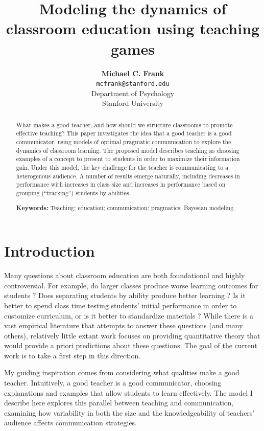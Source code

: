 \documentclass[10pt,letterpaper]{article}
\title{Modeling the dynamics of classroom education using teaching games}
\author{{\large \bf Michael C. Frank} \\
  \texttt{mcfrank@stanford.edu} \\
  Department of Psychology\\
  Stanford University}
\begin{document}
\maketitle

\begin{abstract}
What makes a good teacher, and how should we structure classrooms to promote effective teaching? This paper investigates the idea that a good teacher is a good communicator, using models of optimal pragmatic communication to explore the dynamics of classroom learning. The proposed model describes teaching as choosing examples of a concept to present to students in order to maximize their information gain. Under this model, the key challenge for the teacher is communicating to a heterogenous audience. A number of results emerge naturally, including decreases in performance with increases in class size and increases in performance based on grouping (``tracking'') students by abilities.

\textbf{Keywords:} 
Teaching; education; communication; pragmatics; Bayesian modeling.
\end{abstract}

\section{Introduction}

Many questions about classroom education are both foundational and highly controversial. For example, do larger classes produce worse learning outcomes for students \cite{glass1979,slavin1989}? Does separating students by ability produce better learning \cite{slavin1987}? Is it better to spend class time testing students' initial performance in order to customize curriculum, or is it better to standardize materials \cite{fuchs1986}? While there is a vast empirical literature that attempts to answer these questions (and many others), relatively little extant work focuses on providing quantitative theory that would provide a priori predictions about these questions. The goal of the current work is to take a first step in this direction.

My guiding inspiration comes from considering what qualities make a good teacher. Intuitively, a good teacher is a good communicator, choosing explanations and examples that allow students to learn effectively. The model I describe here explores this parallel between teaching and communication, examining how variability in both the size and the knowledgeability of teachers' audience affects communication strategies. 
\end{document}
